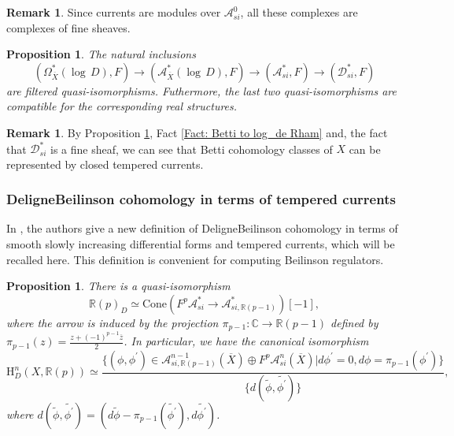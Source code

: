 \documentclass[11pt, a4paper]{amsart}
\theoremstyle{plain}
\newtheorem{proposition}[theorem]{Proposition}
\theoremstyle{definition}
\newtheorem{remark}[theorem]{Remark}
\numberwithin{equation}{section}
\def\CC{\mathbb{C}}
\def\RR{\mathbb{R}}
\begin{document}
\begin{remark}
    Since currents are modules over $\mathcal{A}^{0}_{si}$, all these complexes are complexes of fine sheaves. 
\end{remark}

\begin{proposition} \textnormal{\cite[Theorem 1.1]{BCLRJ24}}
\label{Prop: BGCLRJ24 Theoreom 1.1}
    The natural inclusions 
    \begin{equation*}
        (\Omega^{*}_{\overline{X}}(\log\, D), F) \rightarrow (\mathcal{A}^{*}_{\overline{X}} (\log\, D), F) \rightarrow (\mathcal{A}_{si}^{*}, F) \rightarrow (\mathcal{D}^{*}_{si}, F)
    \end{equation*}
    are filtered quasi-isomorphisms. Futhermore, the last two quasi-isomorphisms are compatible for the corresponding real structures. 
\end{proposition}

\begin{remark}
\label{remark: Betti coh and tempered currents}
    By Proposition \ref{Prop: BGCLRJ24 Theoreom 1.1}, Fact \ref{Fact: Betti to log_de Rham} and, the fact that $\mathcal{D}_{si}^{*}$ is a fine sheaf, we can see that Betti cohomology classes of $X$ can be represented by closed tempered currents. 
\end{remark}


\subsubsection{Deligne{\textendash}Beilinson cohomology in terms of tempered currents}
In \cite{BCLRJ24}, the authors give a new definition of Deligne{\textendash}Beilinson cohomology in terms of smooth slowly increasing differential forms and tempered currents, which will be recalled here. This definition is convenient for computing Beilinson regulators. 

\begin{proposition}
\label{Prop: DB-coh_si forms}
    There is a quasi-isomorphism 
    \begin{equation*}
        \RR(p)_{D} \simeq \mathrm{Cone}(F^{p}\mathcal{A}^{*}_{si} \rightarrow \mathcal{A}_{si, \RR(p-1)}^{*})[-1],
    \end{equation*}
    where the arrow is induced by the projection $\pi_{p-1} \colon \CC \rightarrow \RR(p - 1)$ defined by $\pi_{p - 1}(z) = \frac{z + (-1)^{p-1} \overline{z}}{2}$. In particular, we have the canonical isomorphism 
    \begin{equation}
        \mathrm{H}_{D}^{n}(X, \RR(p)) \simeq \frac{\{ (\phi, \phi^{\prime}) \in  \mathcal{A}_{si, \RR(p-1)}^{n - 1}(\overline{X}) \oplus F^{p} \mathcal{A}_{si}^{n}(\overline{X}) | d \phi^{\prime} = 0, d \phi = \pi_{p - 1}(\phi^{\prime})  \}}{ \{ d(\tilde{\phi}, \tilde{\phi^{\prime}})\}}, 
    \end{equation}
    where $d(\tilde{\phi}, \tilde{\phi^{\prime}}) = (d \tilde{\phi} - \pi_{p -1}(\tilde{\phi^{\prime}}), d\tilde{\phi^{\prime}})$. 
\end{proposition}
\end{document}
